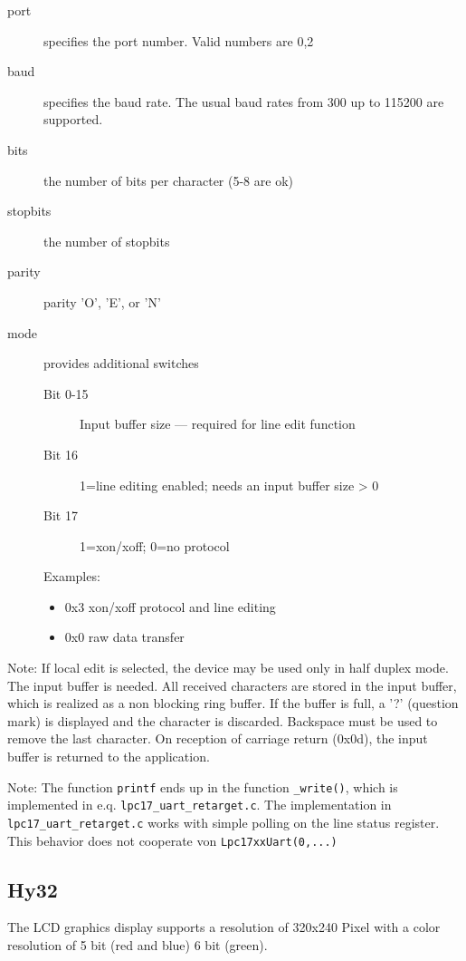 \begin{description}
\item [port] specifies the port number. Valid numbers are 0,2
\item[baud] specifies the baud rate. The usual baud rates from 300 up to 115200 are supported.
\item[bits] the number of bits per character (5-8 are ok)
\item[stopbits] the number of stopbits
\item[parity] parity 'O', 'E', or 'N'
\item[mode] provides additional switches
   \begin{description}
   \item[Bit 0-15] Input buffer size --- required for line edit function
   \item [Bit 16] 1=line editing enabled; needs an input buffer size > 0
   \item [Bit 17] 1=xon/xoff; 0=no protocol
   \end{description}
   Examples:
   \begin{itemize}
   \item  0x3 xon/xoff protocol and line editing
   \item  0x0 raw data transfer
   \end{itemize}
\end{description}
 
Note: If local edit is selected, the device may be used only in 
half duplex mode. The input buffer is needed.
All received characters are stored in the input buffer, which is 
realized as a non blocking ring buffer. If the buffer is full, a  '?'
(question mark) is displayed and the character is discarded. Backspace 
must be used to remove the last character.
On reception of carriage return (0x0d), the input buffer is returned to 
the application.

Note: The function \verb|printf| ends up in the function \verb|_write()|, which
is implemented in e.q. \verb|lpc17_uart_retarget.c|. The implementation
in \verb|lpc17_uart_retarget.c| works with simple polling on the line status
register. This behavior does not cooperate von \verb|Lpc17xxUart(0,...)|


\subsection{Hy32}
The LCD graphics display supports a resolution of 320x240 Pixel with
a color resolution of 5 bit (red and blue) 6 bit (green).

